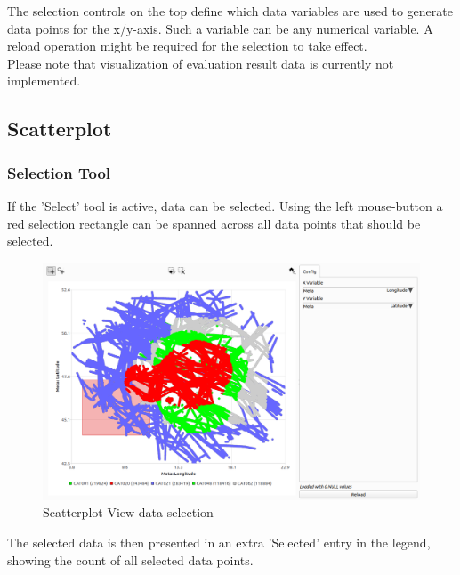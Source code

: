 The selection controls on the top define which data variables are used to generate data points for the x/y-axis. Such a variable can be any numerical variable. A reload operation might be required for the selection to take effect. \\

Please note that visualization of evaluation result data is currently not implemented.

\subsection{Scatterplot}

\subsubsection{Selection Tool}

If the 'Select' tool is active, data can be selected. Using the left mouse-button a red selection rectangle can be spanned across all data points that should be selected.

\begin{figure}[H]
    \hspace*{-2cm}
    \includegraphics[width=18cm,frame]{figures/scatter_select.png}
  \caption{Scatterplot View data selection}
\end{figure}

The selected data is then presented in an extra 'Selected' entry in the legend, showing the count of all selected data points.

